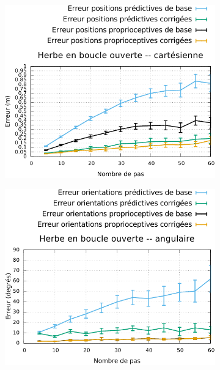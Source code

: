 \begin{figure}[htbp]
    \centerfloat
    \vspace{-0.5cm}
    \begin{subfigure}{0.37\paperwidth}
        \centering
        \includegraphics[type=pdf,ext=.pdf,read=.pdf,width=1.0\linewidth]{../plot/OdometryLWPR/grass_open_compare_cart}
    \end{subfigure}
    \begin{subfigure}{0.37\paperwidth}
        \centering
        \includegraphics[type=pdf,ext=.pdf,read=.pdf,width=1.0\linewidth]{../plot/OdometryLWPR/grass_open_compare_angle}

\end{subfigure}
\end{figure}
